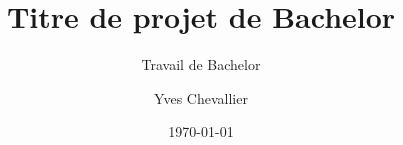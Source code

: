 \author{Yves Chevallier}


\title{Titre de projet de Bachelor}

\subtitle{Travail de Bachelor}


\date{\today}


